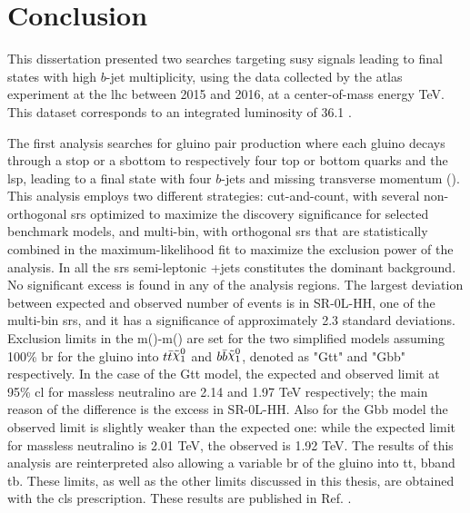 \chapter*{Conclusion}

This dissertation presented two searches targeting \gls{susy} signals leading to final states with 
high $b$-jet multiplicity, using the data collected by the \gls{atlas} experiment at the \gls{lhc} 
between 2015 and 2016, at a center-of-mass energy  \cmtre TeV. 
This dataset corresponds to an integrated luminosity of 36.1 \ifb.

The first analysis searches for gluino pair production where each gluino decays through a stop or a sbottom 
to respectively four top or bottom quarks and the \gls{lsp}, leading to a final state with four $b$-jets and 
missing transverse momentum (\met). 
This analysis employs two different strategies: cut-and-count, with several non-orthogonal \glspl{sr} optimized to 
maximize the discovery significance for selected benchmark models, and multi-bin, with orthogonal \glspl{sr} 
that are statistically combined in the maximum-likelihood fit 
to maximize the exclusion power of the analysis. 
In all the \glspl{sr} semi-leptonic \ttbar+jets constitutes the dominant background.
No significant excess is found in any of the analysis regions. 
The largest deviation between expected and observed number of events 
is in SR-0L-HH, one of the multi-bin \glspl{sr}, and it has a significance of approximately 
2.3 standard deviations. 
Exclusion limits in the m(\gluino)-m(\ninoone) are set for the two simplified models assuming 
100\% \gls{br} for the gluino into $t\bar{t}\ninoone$ and $b\bar{b}\ninoone$, denoted as "Gtt" and "Gbb" respectively.
In the case of the Gtt model, the expected and observed limit at 95\% \gls{cl} for massless neutralino 
are 2.14 and 1.97 TeV respectively; the main reason of the difference is the excess in SR-0L-HH.
Also for the Gbb model the observed limit is slightly weaker than the expected one: 
while the expected limit for massless neutralino is 2.01 TeV, the observed is 1.92 TeV.
The results of this analysis are reinterpreted also allowing a variable \gls{br} of the gluino 
into tt\ninoone, bb\ninoone and tb\chinoonepm. 
These limits, as well as the other limits discussed in this thesis, are obtained with the \gls{cls} 
prescription. These results are published in Ref. \cite{Aaboud:2017hrg}.


